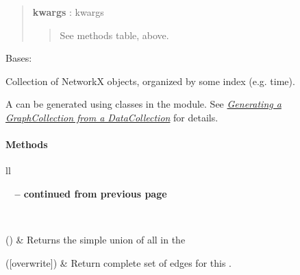 \documentclass[letterpaper,10pt,english]{sphinxmanual}
\begin{document}
\begin{fulllineitems}
\begin{fulllineitems}
\begin{quote}
\begin{description}
\textbf{kwargs} : kwargs
\begin{quote}

See methods table, above.
\end{quote}

\end{description}\end{quote}

\end{fulllineitems}


\end{fulllineitems}


\begin{fulllineitems}
\label{tethne:tethne.data.GraphCollection}
Bases: 

Collection of NetworkX  objects, 
organized by some index (e.g. time).

A {\hyperref[tethne:tethne.data.GraphCollection]{}} can be generated using classes in the
{\hyperref[tethne:module-tethne.builders]{}} module. See 
{\hyperref[tutorial.networks:generate-graphcollection]{\emph{Generating a GraphCollection from a DataCollection}}} for details.
\paragraph{Methods}

\begin{longtable}{ll}
\hline
\endfirsthead

%
{{\bfseries \tablename\ \thetable{} -- continued from previous page}} \\
\hline
\endhead

\hline {} \\ \hline
\endfoot

\hline
\endlastfoot


{\hyperref[tethne:tethne.data.GraphCollection.compose]{}}()
 & 
Returns the simple union of all  in the
\\\hline

{\hyperref[tethne:tethne.data.GraphCollection.edges]{}}({[}overwrite{]})
 & 
Return complete set of edges for this {\hyperref[tethne:tethne.data.GraphCollection]{}} .
\\\hline


\end{longtable}
\end{fulllineitems}
\end{document}
